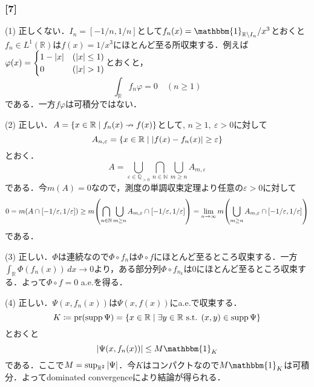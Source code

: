 \documentclass[a4j]{ltjsarticle}
\newcommand{\Rset}{\mathbb{R}}
\newcommand{\Nset}{\mathbb{N}}
\newcommand{\Qset}{\mathbb{Q}}
\newcommand{\1}{\mathbbm{1}}
\DeclareMathOperator*{\supp}{\mathrm{supp}}
\numberwithin{equation}{section}
\theoremstyle{definition}
\begin{document}
\subsubsection*{[7]}
(1) 正しくない．$I_n=[-1/n,1/n]$として$f_n(x)=\1_{\Rset\setminus I_n}/x^3$とおくと$f_n\in L^1(\Rset)$は$f(x)=1/x^3$にほとんど至る所収束する．例えば$\varphi(x)=\begin{cases}
    1-\abs{x} & (\abs{x}\leq 1) \\
    0 & (\abs{x}>1)
\end{cases}$とおくと，
\begin{equation}
    \int_{\Rset}f_n\varphi=0\quad (n\geq 1)
\end{equation}
である．一方$f\varphi$は可積分ではない．

(2) 正しい．$A=\qty{x\in\Rset\mid f_n(x)\nrightarrow f(x)}$として,
$n\geq1,\ \varepsilon>0$に対して
\begin{equation}
    A_{n,\varepsilon}=\qty{x\in\Rset\mid \abs{f(x)-f_n(x)}\geq \varepsilon}
\end{equation}
とおく．
\begin{equation}
    A=\bigcup_{\varepsilon\in \Qset_{>0}}\bigcap_{n\in\Nset}\bigcup_{m\geq n}A_{m,\varepsilon}
\end{equation}
である．今$m(A)=0$なので，測度の単調収束定理より任意の$\varepsilon>0$に対して
\begin{equation}
    0=m(A\cap[-1/\varepsilon,1/\varepsilon])\geq m\qty(\bigcap_{n\in\Nset}\bigcup_{m\geq n}A_{m,\varepsilon}\cap[-1/\varepsilon,1/\varepsilon])=\lim_{n\to\infty}m\qty(\bigcup_{m\geq n}A_{m,\varepsilon}\cap[-1/\varepsilon,1/\varepsilon])
\end{equation}
である．

(3) 正しい．$\Phi$は連続なので$\Phi\circ f_n$は$\Phi\circ f$にほとんど至るところ収束する．一方$\int_{\Rset}\Phi(f_n(x))\,dx\to0$より，ある部分列$\Phi\circ f_{n_k}$は0にほとんど至るところ収束する．よって$\Phi\circ f=0$ a.e.を得る．

(4) 正しい．$\Psi(x,f_n(x))$は$\Psi(x,f(x))$にa.e.で収束する．
\begin{equation}
    K\coloneq \mathop{\mathrm{pr}}(\supp\Psi)=\qty{x\in\Rset\mid \exists y\in\Rset \text{ s.t. }(x,y)\in \supp\Psi}
\end{equation}
とおくと
\begin{equation}
    \abs{\Psi(x,f_n(x))}\leq M\1_{K}
\end{equation}
である．ここで$M=\sup_{\Rset^2}\abs{\Psi}$．今$K$はコンパクトなので$M\1_{K}$は可積分．よってdominated convergenceにより結論が得られる．
\end{document}
